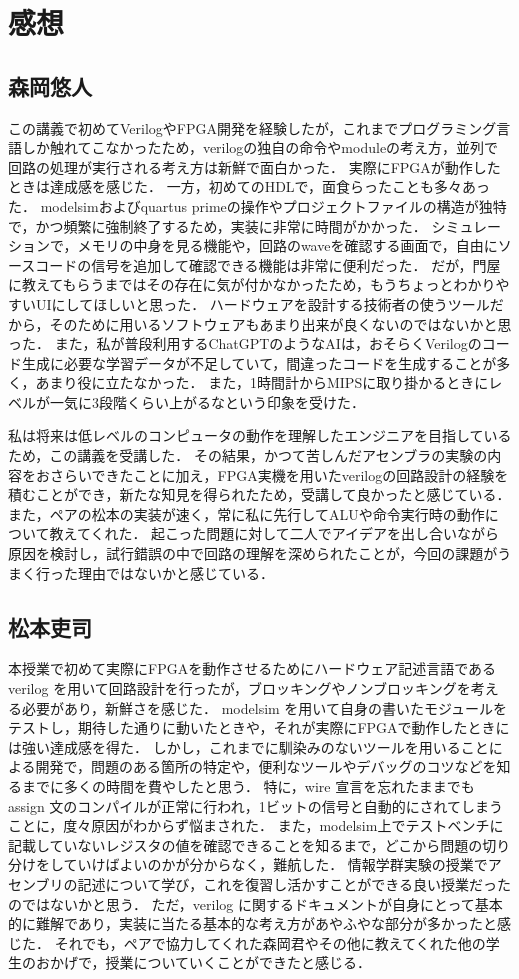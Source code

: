 \documentclass[dvipdfmx]{jsarticle}
\begin{document}
\section{感想}
\subsection{森岡悠人}
この講義で初めてVerilogやFPGA開発を経験したが，これまでプログラミング言語しか触れてこなかったため，verilogの独自の命令やmoduleの考え方，並列で回路の処理が実行される考え方は新鮮で面白かった．
実際にFPGAが動作したときは達成感を感じた．
一方，初めてのHDLで，面食らったことも多々あった．
modelsimおよびquartus primeの操作やプロジェクトファイルの構造が独特で，かつ頻繁に強制終了するため，実装に非常に時間がかかった．
シミュレーションで，メモリの中身を見る機能や，回路のwaveを確認する画面で，自由にソースコードの信号を追加して確認できる機能は非常に便利だった．
だが，門屋に教えてもらうまではその存在に気が付かなかったため，もうちょっとわかりやすいUIにしてほしいと思った．
ハードウェアを設計する技術者の使うツールだから，そのために用いるソフトウェアもあまり出来が良くないのではないかと思った．
また，私が普段利用するChatGPTのようなAIは，おそらくVerilogのコード生成に必要な学習データが不足していて，間違ったコードを生成することが多く，あまり役に立たなかった．
また，1時間計からMIPSに取り掛かるときにレベルが一気に3段階くらい上がるなという印象を受けた．

私は将来は低レベルのコンピュータの動作を理解したエンジニアを目指しているため，この講義を受講した．
その結果，かつて苦しんだアセンブラの実験の内容をおさらいできたことに加え，FPGA実機を用いたverilogの回路設計の経験を積むことができ，新たな知見を得られたため，受講して良かったと感じている．
また，ペアの松本の実装が速く，常に私に先行してALUや命令実行時の動作について教えてくれた．
起こった問題に対して二人でアイデアを出し合いながら原因を検討し，試行錯誤の中で回路の理解を深められたことが，今回の課題がうまく行った理由ではないかと感じている．

\subsection{松本吏司}
本授業で初めて実際にFPGAを動作させるためにハードウェア記述言語である verilog を用いて回路設計を行ったが，ブロッキングやノンブロッキングを考える必要があり，新鮮さを感じた．
modelsim を用いて自身の書いたモジュールをテストし，期待した通りに動いたときや，それが実際にFPGAで動作したときには強い達成感を得た．
しかし，これまでに馴染みのないツールを用いることによる開発で，問題のある箇所の特定や，便利なツールやデバッグのコツなどを知るまでに多くの時間を費やしたと思う．
特に，wire 宣言を忘れたままでも assign 文のコンパイルが正常に行われ，1ビットの信号と自動的にされてしまうことに，度々原因がわからず悩まされた．
また，modelsim上でテストベンチに記載していないレジスタの値を確認できることを知るまで，どこから問題の切り分けをしていけばよいのかが分からなく，難航した．
情報学群実験の授業でアセンブリの記述について学び，これを復習し活かすことができる良い授業だったのではないかと思う．
ただ，verilog に関するドキュメントが自身にとって基本的に難解であり，実装に当たる基本的な考え方があやふやな部分が多かったと感じた．
それでも，ペアで協力してくれた森岡君やその他に教えてくれた他の学生のおかげで，授業についていくことができたと感じる．
\end{document}
